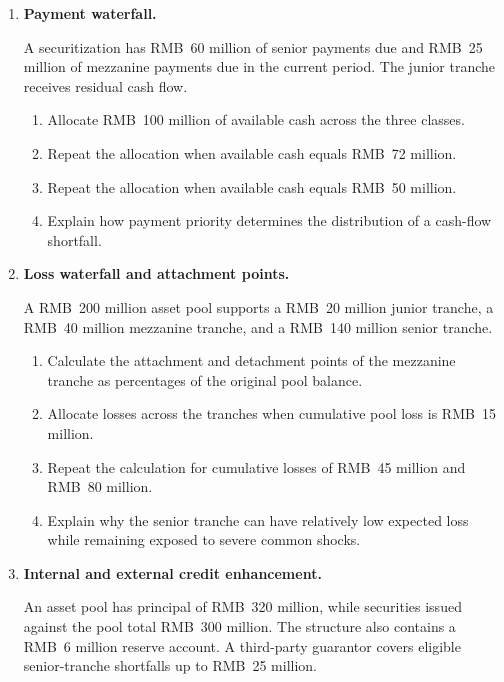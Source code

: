\begin{enumerate}
\item \textbf{Payment waterfall.}

A securitization has RMB~60 million of senior payments due and RMB~25 million of mezzanine payments due in the current period. The junior tranche receives residual cash flow.

\begin{enumerate}

\item Allocate RMB~100 million of available cash across the three classes.

\item Repeat the allocation when available cash equals RMB~72 million.

\item Repeat the allocation when available cash equals RMB~50 million.

\item Explain how payment priority determines the distribution of a cash-flow shortfall.

\end{enumerate}


\item \textbf{Loss waterfall and attachment points.}

A RMB~200 million asset pool supports a RMB~20 million junior tranche, a RMB~40 million mezzanine tranche, and a RMB~140 million senior tranche.

\begin{enumerate}

\item Calculate the attachment and detachment points of the mezzanine tranche as percentages of the original pool balance.

\item Allocate losses across the tranches when cumulative pool loss is RMB~15 million.

\item Repeat the calculation for cumulative losses of RMB~45 million and RMB~80 million.

\item Explain why the senior tranche can have relatively low expected loss while remaining exposed to severe common shocks.

\end{enumerate}


\item \textbf{Internal and external credit enhancement.}

An asset pool has principal of RMB~320 million, while securities issued against the pool total RMB~300 million. The structure also contains a RMB~6 million reserve account. A third-party guarantor covers eligible senior-tranche shortfalls up to RMB~25 million.


\end{enumerate}

